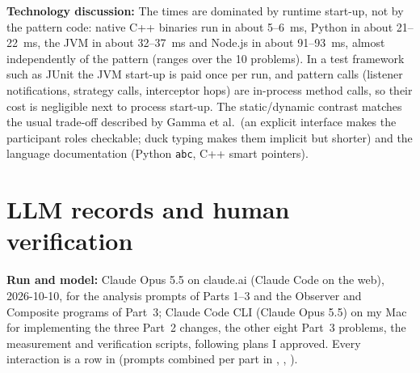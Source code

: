 \documentclass[11pt,a4paper]{article}
\newcommand{\entry}[1]{\textbf{#1:} }
\begin{document}
\entry{Technology discussion}The times are dominated by runtime start-up, not by the pattern code: native C++ binaries run in about 5--6~ms, Python in about 21--22~ms, the JVM in about 32--37~ms and Node.js in about 91--93~ms, almost independently of the pattern (ranges over the 10 problems). In a test framework such as JUnit the JVM start-up is paid once per run, and pattern calls (listener notifications, strategy calls, interceptor hops) are in-process method calls, so their cost is negligible next to process start-up. The static/dynamic contrast matches the usual trade-off described by Gamma et al.\ (an explicit interface makes the participant roles checkable; duck typing makes them implicit but shorter) and the language documentation (Python \texttt{abc}, C++ smart pointers).

\section{LLM records and human verification}
\entry{Run and model}Claude Opus 5.5 on claude.ai (Claude Code on the web), 2026-10-10, for the analysis prompts of Parts 1--3 and the Observer and Composite programs of Part~3; Claude Code CLI (Claude Opus 5.5) on my Mac for implementing the three Part~2 changes, the other eight Part~3 problems, the measurement and verification scripts, following plans I approved. Every interaction is a row in  (prompts combined per part in , , ).
\end{document}

